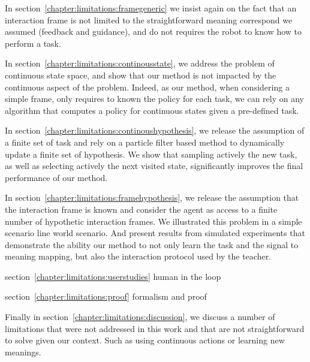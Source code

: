 In section~\ref{chapter:limitations:framegeneric} we insist again on the fact that an interaction frame is not limited to the straightforward meaning correspond we assumed (feedback and guidance), and do not requires the robot to know how to perform a task.

In section~\ref{chapter:limitations:continousstate}, we address the problem of continuous state space, and show that our method is not impacted by the continuous aspect of the problem. Indeed, as our method, when considering a simple frame, only requires to known the policy for each task, we can rely on any algorithm that computes a policy for continuous states given a pre-defined task.

In section~\ref{chapter:limitations:continoushypothesis}, we release the assumption of a finite set of task and rely on a particle filter based method to dynamically update a finite set of hypothesis. We show that sampling actively the new task, as well as selecting actively the next visited state, significantly improves the final performance of our method.

In section~\ref{chapter:limitations:framehypothesis}, we release the assumption that the interaction frame is known and consider the agent as access to a finite number of hypothetic interaction frames. We illustrated this problem in a simple scenario line world scenario. And present results from simulated experiments that demonstrate the ability our method to not only learn the task and the signal to meaning mapping, but also the interaction protocol used by the teacher.


section~\ref{chapter:limitations:userstudies}
human in the loop

section~\ref{chapter:limitations:proof}
formalism and proof


Finally in section~\ref{chapter:limitations:discussion}, we discuss a number of limitations that were not addressed in this work and that are not straightforward to solve given our context. Such as using continuous actions or learning new meanings.





